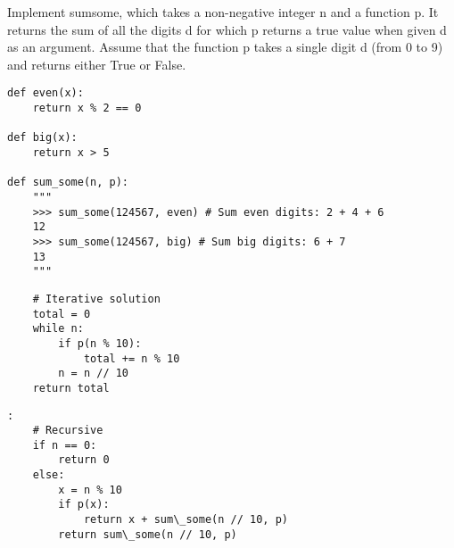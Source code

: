 \begin{blocksection}
\question Implement sumsome, which takes a non-negative integer n and a function p. It returns the sum of all the digits d for which p returns a true value when given d as an argument. Assume that the function p takes a single digit d (from 0 to 9) and returns either True or False. 

\begin{lstlisting}
def even(x):
    return x % 2 == 0

def big(x):
    return x > 5

def sum_some(n, p): 
    """
    >>> sum_some(124567, even) # Sum even digits: 2 + 4 + 6 
    12 
    >>> sum_some(124567, big) # Sum big digits: 6 + 7 
    13 
    """ 
\end{lstlisting}
\begin{solution}[1in]
\begin{lstlisting}
    # Iterative solution
    total = 0
    while n:
        if p(n % 10):
            total += n % 10
        n = n // 10
    return total
\end{lstlisting}
\end{solution}
\begin{solution}[1in]
\begin{lstlisting}:
    # Recursive
    if n == 0:
        return 0
    else:
        x = n % 10
        if p(x):
            return x + sum\_some(n // 10, p)
        return sum\_some(n // 10, p)
\end{lstlisting}
\end{solution}
\end{blocksection}
